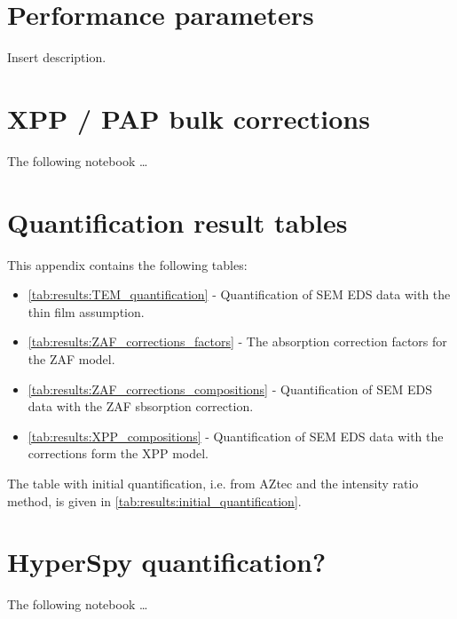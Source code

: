 



\chapter{Performance parameters}
\label{appendix:performance}

Insert description.


\chapter{XPP / PAP bulk corrections}
\label{appendix:xpp}

The following notebook \dots
% 



\chapter{Quantification result tables}
\label{appendix:tables}

This appendix contains the following tables:

\begin{itemize}
    \item \cref{tab:results:TEM_quantification} - Quantification of SEM EDS data with the thin film assumption.
    \item \cref{tab:results:ZAF_corrections_factors} - The absorption correction factors for the ZAF model.
    \item \cref{tab:results:ZAF_corrections_compositions} - Quantification of SEM EDS data with the ZAF sbsorption correction.
    \item \cref{tab:results:XPP_compositions} - Quantification of SEM EDS data with the corrections form the XPP model.    
\end{itemize}

The table with initial quantification, i.e. from AZtec and the intensity ratio method, is given in \cref{tab:results:initial_quantification}.








\chapter{HyperSpy quantification?}
\label{appendix:HSquant}

The following notebook \dots
% 
